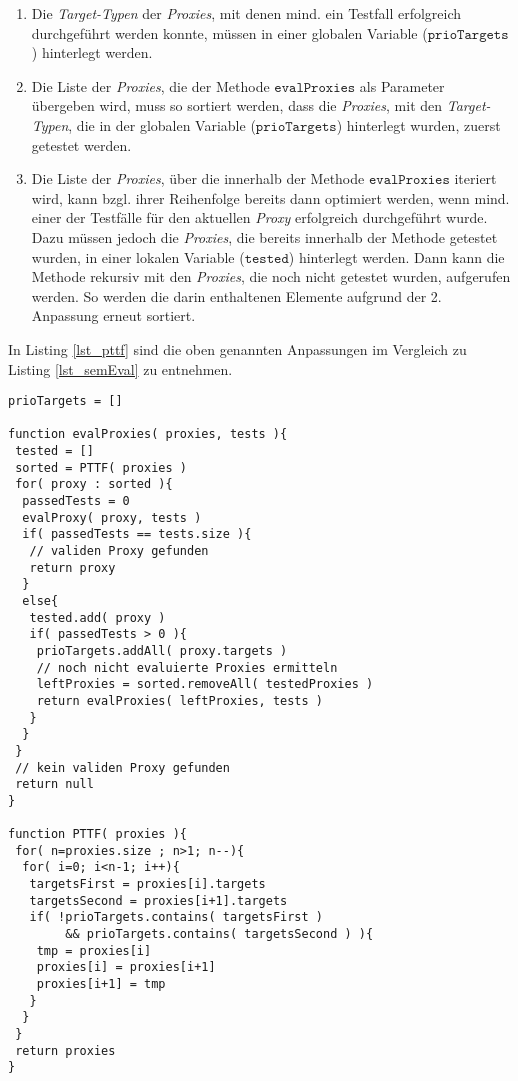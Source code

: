 \begin{enumerate}
\item 
Die \emph{Target-Typen} der \emph{Proxies}, mit denen mind. ein Testfall erfolgreich durchgeführt werden konnte, müssen in einer globalen Variable ($\texttt{prioTargets}$) hinterlegt werden.

\item 
Die Liste der \emph{Proxies}, die der Methode $\texttt{evalProxies}$ als Parameter übergeben wird, muss so sortiert werden, dass die \emph{Proxies}, mit den \emph{Target-Typen}, die in der globalen Variable ($\texttt{prioTargets}$) hinterlegt wurden, zuerst getestet werden. 

\item 
Die Liste der \emph{Proxies}, über die innerhalb der Methode $\texttt{evalProxies}$ iteriert wird, kann bzgl. ihrer Reihenfolge bereits dann optimiert werden, wenn mind. einer der Testfälle für den aktuellen \emph{Proxy} erfolgreich durchgeführt wurde. Dazu müssen jedoch die \emph{Proxies}, die bereits innerhalb der Methode getestet wurden, in einer lokalen Variable ($\texttt{tested}$) hinterlegt werden. Dann kann die Methode rekursiv mit den \emph{Proxies}, die noch nicht getestet wurden, aufgerufen werden. So werden die darin enthaltenen Elemente aufgrund der 2. Anpassung erneut sortiert.
\end{enumerate}  
In Listing \ref{lst_pttf} sind die oben genannten Anpassungen im Vergleich zu Listing \ref{lst_semEval} zu entnehmen. 
\begin{lstlisting}[style = pseudo, caption = Semantische Evaluation mit Heuristik PTTF, captionpos = b, label = lst_pttf]
prioTargets = []

function evalProxies( proxies, tests ){
 tested = []
 sorted = PTTF( proxies )
 for( proxy : sorted ){
  passedTests = 0
  evalProxy( proxy, tests )
  if( passedTests == tests.size ){
   // validen Proxy gefunden
   return proxy
  }
  else{
   tested.add( proxy )
   if( passedTests > 0 ){
    prioTargets.addAll( proxy.targets )
    // noch nicht evaluierte Proxies ermitteln
    leftProxies = sorted.removeAll( testedProxies )
    return evalProxies( leftProxies, tests )
   }
  }
 }
 // kein validen Proxy gefunden
 return null
}

function PTTF( proxies ){
 for( n=proxies.size ; n>1; n--){
  for( i=0; i<n-1; i++){
   targetsFirst = proxies[i].targets
   targetsSecond = proxies[i+1].targets			
   if( !prioTargets.contains( targetsFirst ) 
        && prioTargets.contains( targetsSecond ) ){
    tmp = proxies[i]
    proxies[i] = proxies[i+1]
    proxies[i+1] = tmp
   }
  }
 }
 return proxies	
}
\end{lstlisting}

